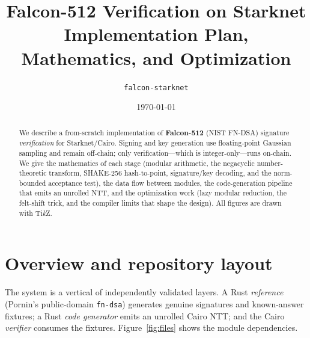 \documentclass[11pt]{article}
\title{\textbf{Falcon-512 Verification on Starknet}\\[2pt]
\large Implementation Plan, Mathematics, and Optimization}
\author{\texttt{falcon-starknet}}
\date{\today}
\begin{document}
\maketitle

\begin{abstract}
We describe a from-scratch implementation of \textbf{Falcon-512} (NIST FN-DSA) signature
\emph{verification} for Starknet/Cairo. Signing and key generation use floating-point Gaussian
sampling and remain off-chain; only verification---which is integer-only---runs on-chain. We
give the mathematics of each stage (modular arithmetic, the negacyclic number-theoretic
transform, SHAKE-256 hash-to-point, signature/key decoding, and the norm-bounded acceptance
test), the data flow between modules, the code-generation pipeline that emits an unrolled NTT,
and the optimization work (lazy modular reduction, the felt-shift trick, and the compiler
limits that shape the design). All figures are drawn with Ti\emph{k}Z.
\end{abstract}

\tableofcontents

\section{Overview and repository layout}
The system is a vertical of independently validated layers. A Rust \emph{reference}
(Pornin's public-domain \texttt{fn-dsa}) generates genuine signatures and known-answer
fixtures; a Rust \emph{code generator} emits an unrolled Cairo NTT; and the Cairo
\emph{verifier} consumes the fixtures. Figure~\ref{fig:files} shows the module dependencies.
\end{document}
